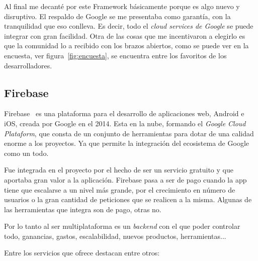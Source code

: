 Al final me decanté por este Framework básicamente porque es algo nuevo y disruptivo. El respaldo de Google se me presentaba como garantía, con la tranquilidad que eso conlleva. Es decir, todo el \emph{cloud services de Google} se puede integrar con gran facilidad.
Otra de las cosas que me incentivaron a elegirlo es que la comunidad lo a recibido con los brazos abiertos, como se puede ver en la encuesta, ver figura~\ref{fig:encuesta}, se encuentra entre los favoritos de los desarrolladores.

\subsection{Firebase}
Firebase~\cite{wiki:firebase} es una plataforma para el desarrollo de aplicaciones web, Android e iOS, creada por Google en el 2014. Esta en la nube, formando el \emph{Google Cloud Plataform}, que consta de un conjunto de herramientas para dotar de una calidad enorme a los proyectos. Ya que permite la integración del ecosistema de Google como un todo.

Fue integrada en el proyecto por el hecho de ser un servicio gratuito y que aportaba gran valor a la aplicación. Firebase pasa a ser de pago cuando la app tiene que escalarse a un nivel más grande, por el crecimiento en número de usuarios o la gran cantidad de peticiones que se realicen a la misma. Algunas de las herramientas que integra son de pago, otras no.

Por lo tanto al ser multiplataforma es un \emph{backend} con el que poder controlar todo, ganancias, gastos, escalabilidad, nuevos productos, herramientas... 

Entre los servicios que ofrece destacan entre otros:

